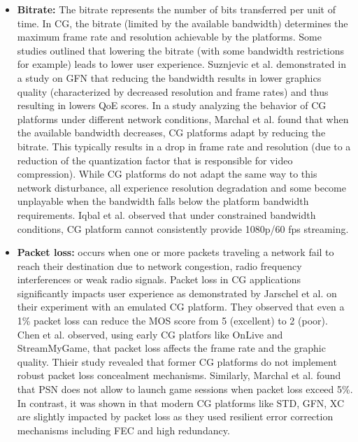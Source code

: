 \begin{itemize}
    \item \textbf{Bitrate:} The bitrate represents the number of bits transferred per unit of time. In CG, the bitrate (limited by the available bandwidth) determines the maximum frame rate and resolution achievable by the platforms. Some studies outlined that lowering the bitrate (with some bandwidth restrictions for example) leads to lower user experience. Suznjevic et al. \cite{suznjevic2016analysis} demonstrated in a study on GFN that reducing the bandwidth results in lower graphics quality (characterized by decreased resolution and frame rates) and thus resulting in lowers QoE scores.
    In a study analyzing the behavior of CG platforms under different network conditions, Marchal et al. \cite{marchal2023analysis} found that when the available bandwidth decreases, CG platforms adapt by reducing the bitrate. This typically results in a drop in frame rate and resolution (due to a reduction of the quantization factor that is responsible for video compression). While CG platforms do not adapt the same way to this network disturbance, all experience resolution degradation and some become unplayable when the bandwidth falls below the platform bandwidth requirements. Iqbal et al. \cite{Iqbal2021DissectingCG} observed that under constrained bandwidth conditions, CG platform cannot consistently provide 1080p/60 fps streaming.


    \item \textbf{Packet loss:} occurs when one or more packets traveling a network fail to reach their destination due to network congestion, radio frequency interferences or weak radio signals. Packet loss in CG applications significantly impacts user experience as demonstrated by Jarschel et al. \cite{jarschel2013gaming} on their experiment with an emulated CG platform. They observed that even a 1\% packet loss can reduce the \ac{MOS} score from 5 (excellent) to 2 (poor). Chen et al. \cite{chen2013quality} observed, using early CG platfors like OnLive and StreamMyGame, that packet loss affects the frame rate and the graphic quality. Thieir study revealed that former CG platforms do not implement robust packet loss concealment mechanisms. Similarly, Marchal et al. \cite{marchal2023analysis} found that \ac{PSN} does not allow to launch game sessions when packet loss exceed 5\%. In contrast, it was shown in \cite{Aumont2021DissectingCG, marchal2023analysis} that modern CG platforms like STD, GFN, XC are slightly impacted by packet loss as they used resilient error correction mechanisms including \ac{FEC} and high redundancy.
\end{itemize}


